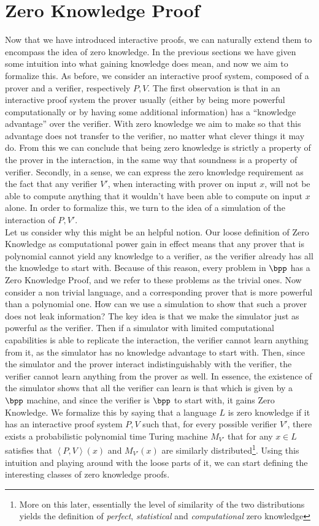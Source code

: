 \documentclass{article}
\begin{document}
\section{Zero Knowledge Proof}
\label{zkp}
Now that we have introduced interactive proofs, we can naturally extend them to encompass the idea of zero knowledge.
In the previous sections we have given some intuition into what gaining knowledge does mean, and now we aim to
formalize this. As before, we consider an interactive proof system, composed of a prover and a verifier,
respectively $P, V$. The first observation is that in an interactive proof system the prover usually
(either by being more powerful computationally or by having some additional information) has
a \enquote{knowledge advantage} over the verifier.
With zero knowledge we aim to make so that this advantage does not transfer to the verifier,
no matter what clever things it may do. From this we can conclude that being zero knowledge is strictly a
property of the prover in the interaction, in the same way that soundness is a property of verifier.
Secondly, in a sense, we can express the zero knowledge requirement as the fact that any verifier $V'$,
when interacting with prover on input $x$, will not be able to compute anything that it wouldn't have been able
to compute on input $x$ alone. In order to formalize this, we turn to the idea of a simulation of
the interaction of $P, V'$. \\
Let us consider why this might be an helpful notion.
Our loose definition of Zero Knowledge as computational power gain in effect means that any prover that
is polynomial cannot yield any knowledge to a verifier, as the verifier already has all the knowledge to start with.
Because of this reason, every problem in $\bpp$ has a Zero Knowledge Proof, and we refer to these problems as the trivial ones.
Now consider a non trivial language, and a corresponding prover that is more powerful than a polynomial one. How can
we use a simulation to show that such a prover does not leak information? The key idea is that we make the simulator
just as powerful as the verifier. Then if a simulator with limited computational capabilities is able to replicate
the interaction, the verifier cannot learn anything from it, as the simulator has no knowledge advantage to start with. Then,
since the simulator and the prover interact indistinguishably with the verifier, the verifier cannot learn anything from the
prover as well. In essence, the existence of the simulator shows that all the verifier can learn is that which is given
by a $\bpp$ machine, and since the verifier is $\bpp$ to start with, it gains Zero Knowledge.
We formalize this by saying that a language $L$ is zero knowledge if it has an interactive proof system $P, V$ such
that, for every possible verifier $V'$, there exists a probabilistic polynomial time Turing machine $M_{V'}$ that
for any $x \in L$ satisfies that $\left<P, V\right>(x)$ and $M_{V'}(x)$ are similarly
distributed\footnote{More on this later, essentially the level of similarity of the two distributions yields
    the definition of \textit{perfect}, \textit{statistical} and \textit{computational} zero knowledge}.
Using this intuition and playing around with the loose parts of it, we can start defining the interesting classes of zero knowledge proofs.
\end{document}
